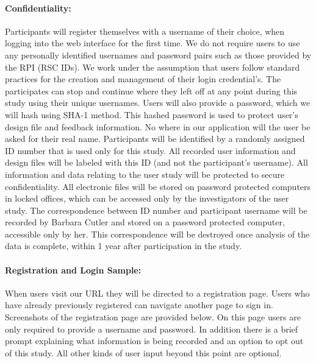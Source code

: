 \documentclass[12pt]{article}
\begin{document}
\paragraph{Confidentiality:} 
Participants will register themselves with a username of their choice,
when logging into the web interface for the first time. 
We do not require users to use any personally identified usernames and password pairs such as those provided by
the RPI (RSC IDs). We work under the assumption that users follow standard practices for the creation 
and management of their login credential's.
The participates can stop and continue where they left off at any point during this study using their
unique usernames. Users will also provide a password, which we will hash using SHA-1 method. 
This hashed password is used to protect user's design file and
feedback information. No where in our application will the user be asked for their real 
name. Participants will be identified by a randomly assigned ID number that is used only for 
this study. All recorded user information and design files will be labeled with this ID 
(and not the participant's username). All information and data relating to the user study 
will be protected to secure confidentiality. All electronic files will be stored on password 
protected computers in locked offices, which can be accessed only by the investigators of 
the user study. The correspondence between ID number and participant username will be recorded 
by Barbara Cutler and stored on a password protected computer, accessible only by her. 
This correspondence will be destroyed once analysis of the data is complete, within 1 year 
after participation in the study.

\newpage
\paragraph{Registration and Login Sample:}
When users visit our URL they will be directed to a registration page. Users who have already previously registered can navigate another page to sign in. Screenshots of the registration page are provided below. On this page users are only required to provide a username and password. In addition there is a brief prompt explaining what information is being recorded and an option to opt out of this study. All other kinds of user input beyond this point are optional.
\end{document}

